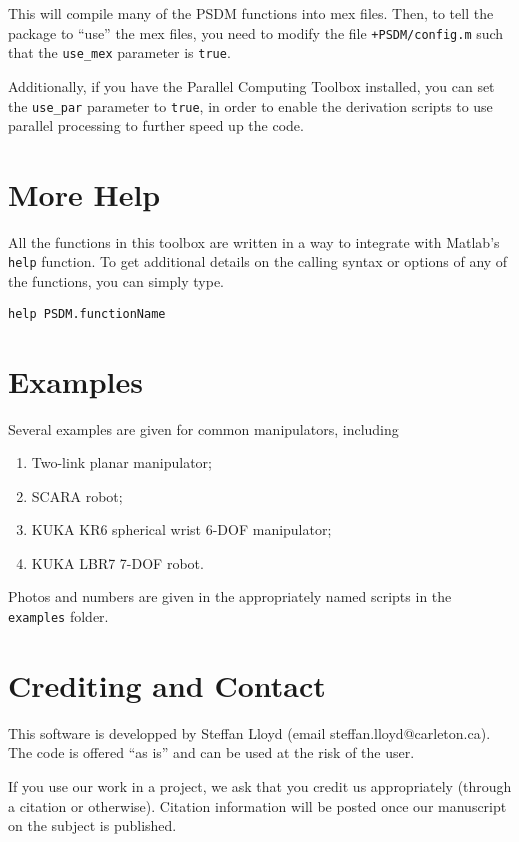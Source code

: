\documentclass[12pt]{article}
\begin{document}
This will compile many of the PSDM functions into mex files. Then, to tell the package to ``use'' the mex files, you need to modify the file \texttt{+PSDM/config.m} such that the \texttt{use\_mex} parameter is \texttt{true}.

Additionally, if you have the Parallel Computing Toolbox installed, you can set the \texttt{use\_par} parameter to \texttt{true}, in order to enable the derivation scripts to use parallel processing to further speed up the code.

\section{More Help}

All the functions in this toolbox are written in a way to integrate with Matlab's \texttt{help} function. To get additional details on the calling syntax or options of any of the functions, you can simply type.
\begin{lstlisting}
help PSDM.functionName
\end{lstlisting}

\section{Examples}

Several examples are given for common manipulators, including
\begin{enumerate}[itemsep=0pt]
	\item Two-link planar manipulator;
	\item SCARA robot;
	\item KUKA KR6 spherical wrist 6-DOF manipulator;
	\item KUKA LBR7 7-DOF robot.
\end{enumerate}\vspace{1em}
Photos and numbers are given in the appropriately named scripts in the \texttt{examples} folder.

\section{Crediting and Contact}

This software is developped by Steffan Lloyd (email steffan.lloyd@carleton.ca). The code is offered ``as is'' and can be used at the risk of the user.

If you use our work in a project, we ask that you credit us appropriately (through a citation or otherwise). Citation information will be posted once our manuscript on the subject is published.



\end{document}
